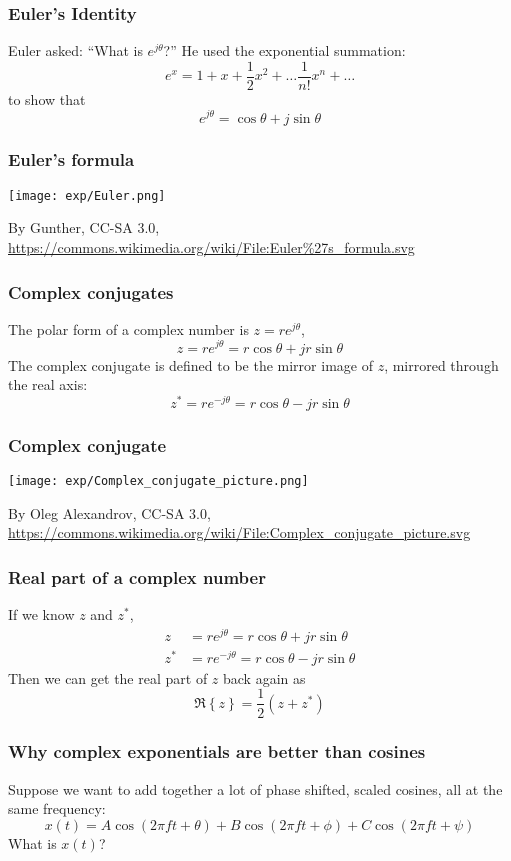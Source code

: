 \documentclass{beamer}
\begin{document}
\begin{frame}
  \frametitle{Euler's Identity}

  Euler asked: ``What is $e^{j\theta}$?''  He used the exponential summation:
  \[
  e^{x} = 1 + x + \frac{1}{2}x^2 + \ldots \frac{1}{n!} x^n+\ldots
  \]
  to show that
  \[
  e^{j\theta} = \cos\theta + j\sin\theta
  \]
\end{frame}

\begin{frame}
  \frametitle{Euler's formula}

  \centerline{\texttt{[image: exp/Euler.png]}}
  \begin{tiny}
    By Gunther, CC-SA 3.0,
    \url{https://commons.wikimedia.org/wiki/File:Euler\%27s_formula.svg}
  \end{tiny}
\end{frame}

\begin{frame}
  \frametitle{Complex conjugates}

  The polar form of a complex number is $z=re^{j\theta}$,
  \[
  z = re^{j\theta} = r\cos\theta + jr\sin\theta
  \]
  The complex conjugate is defined to be the mirror image of $z$,
  mirrored through the real axis:
  \[
  z^* = re^{-j\theta} = r\cos\theta - jr\sin\theta
  \]
\end{frame}

\begin{frame}
  \frametitle{Complex conjugate}

  \centerline{\texttt{[image: exp/Complex\_conjugate\_picture.png]}}
  \begin{tiny}
    By Oleg Alexandrov, CC-SA 3.0,
    \url{https://commons.wikimedia.org/wiki/File:Complex_conjugate_picture.svg}
  \end{tiny}
\end{frame}

\begin{frame}
  \frametitle{Real part of a complex number}

  If we know $z$ and $z^*$,
  \begin{align*}
  z &= re^{j\theta} = r\cos\theta + jr\sin\theta\\
  z^* &= re^{-j\theta} = r\cos\theta - jr\sin\theta
  \end{align*}
  Then we can get the real part of $z$ back again as
  \[
  \Re\left\{z\right\} = \frac{1}{2}\left(z+z^*\right)
  \]
\end{frame}

\begin{frame}
  \frametitle{Why complex exponentials are better than cosines}

  Suppose we want to add together a lot of phase shifted, scaled
  cosines, all at the same frequency:
  \[
  x(t) = A\cos\left(2\pi ft+\theta\right)+B\cos\left(2\pi ft+\phi\right)+C\cos\left(2\pi ft+\psi\right)
  \]
  What is $x(t)$?
\end{frame}
\end{document}
